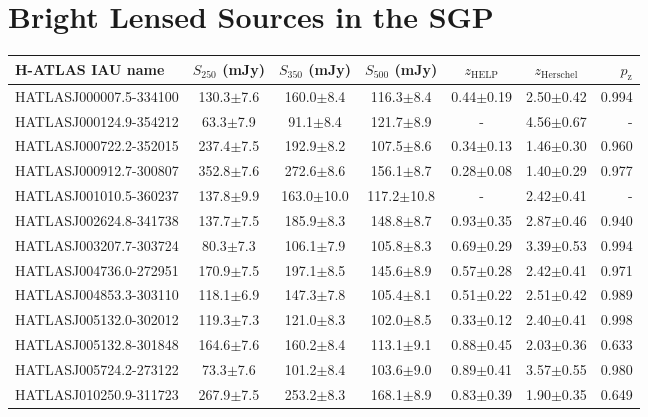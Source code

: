 \chapter{Bright Lensed Sources in the SGP}
\begin{landscape}

\begin{longtable}[h!]{lcccccr}
    \hline
    \hline
    H-ATLAS IAU name & $S_{250}$ (mJy) & $S_{350}$ (mJy) & $S_{500}$ (mJy) & $z_{\textrm{HELP}}$ & $z_{\textrm{Herschel}}$ & $p_{\textrm{z}}$ \\
    \hline
    HATLASJ000007.5-334100 & 130.3$\pm$7.6 & 160.0$\pm$8.4 & 116.3$\pm$8.4 & 0.44$\pm$0.19 & 2.50$\pm$0.42 & 0.994 \\
    HATLASJ000124.9-354212 & 63.3$\pm$7.9 & 91.1$\pm$8.4 & 121.7$\pm$8.9 & - & 4.56$\pm$0.67 & - \\
    HATLASJ000722.2-352015 & 237.4$\pm$7.5 & 192.9$\pm$8.2 & 107.5$\pm$8.6 & 0.34$\pm$0.13 & 1.46$\pm$0.30 & 0.960 \\
    HATLASJ000912.7-300807 & 352.8$\pm$7.6 & 272.6$\pm$8.6 & 156.1$\pm$8.7 & 0.28$\pm$0.08 & 1.40$\pm$0.29 & 0.977 \\
    HATLASJ001010.5-360237 & 137.8$\pm$9.9 & 163.0$\pm$10.0 & 117.2$\pm$10.8 & - & 2.42$\pm$0.41 & - \\
    HATLASJ002624.8-341738 & 137.7$\pm$7.5 & 185.9$\pm$8.3 & 148.8$\pm$8.7 & 0.93$\pm$0.35 & 2.87$\pm$0.46 & 0.940 \\
    HATLASJ003207.7-303724 & 80.3$\pm$7.3 & 106.1$\pm$7.9 & 105.8$\pm$8.3 & 0.69$\pm$0.29 & 3.39$\pm$0.53 & 0.994 \\ 
    HATLASJ004736.0-272951 & 170.9$\pm$7.5 & 197.1$\pm$8.5 & 145.6$\pm$8.9 & 0.57$\pm$0.28 & 2.42$\pm$0.41 & 0.971 \\ 
    HATLASJ004853.3-303110 & 118.1$\pm$6.9 & 147.3$\pm$7.8 & 105.4$\pm$8.1 & 0.51$\pm$0.22 & 2.51$\pm$0.42 & 0.989 \\ 
    HATLASJ005132.0-302012 & 119.3$\pm$7.3 & 121.0$\pm$8.3 & 102.0$\pm$8.5 & 0.33$\pm$0.12 & 2.40$\pm$0.41 & 0.998 \\
    HATLASJ005132.8-301848 & 164.6$\pm$7.6 & 160.2$\pm$8.4 & 113.1$\pm$9.1 & 0.88$\pm$0.45 & 2.03$\pm$0.36 & 0.633 \\
    HATLASJ005724.2-273122 & 73.3$\pm$7.6 & 101.2$\pm$8.4 & 103.6$\pm$9.0 & 0.89$\pm$0.41 & 3.57$\pm$0.55 & 0.980 \\
    HATLASJ010250.9-311723 & 267.9$\pm$7.5 & 253.2$\pm$8.3 & 168.1$\pm$8.9 & 0.83$\pm$0.39 & 1.90$\pm$0.35 & 0.649 \\

\end{longtable}
\end{landscape}
